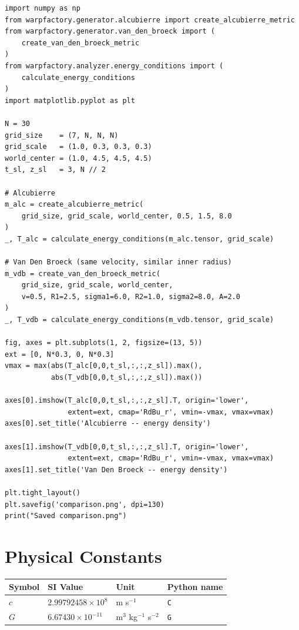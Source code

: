 \documentclass[11pt, a4paper, twoside]{report}
\begin{document}
\begin{lstlisting}[caption={Side-by-side energy comparison}]
import numpy as np
from warpfactory.generator.alcubierre import create_alcubierre_metric
from warpfactory.generator.van_den_broeck import (
    create_van_den_broeck_metric
)
from warpfactory.analyzer.energy_conditions import (
    calculate_energy_conditions
)
import matplotlib.pyplot as plt

N = 30
grid_size    = (7, N, N, N)
grid_scale   = (1.0, 0.3, 0.3, 0.3)
world_center = (1.0, 4.5, 4.5, 4.5)
t_sl, z_sl   = 3, N // 2

# Alcubierre
m_alc = create_alcubierre_metric(
    grid_size, grid_scale, world_center, 0.5, 1.5, 8.0
)
_, T_alc = calculate_energy_conditions(m_alc.tensor, grid_scale)

# Van Den Broeck (same velocity, similar inner radius)
m_vdb = create_van_den_broeck_metric(
    grid_size, grid_scale, world_center,
    v=0.5, R1=2.5, sigma1=6.0, R2=1.0, sigma2=8.0, A=2.0
)
_, T_vdb = calculate_energy_conditions(m_vdb.tensor, grid_scale)

fig, axes = plt.subplots(1, 2, figsize=(13, 5))
ext = [0, N*0.3, 0, N*0.3]
vmax = max(abs(T_alc[0,0,t_sl,:,:,z_sl]).max(),
           abs(T_vdb[0,0,t_sl,:,:,z_sl]).max())

axes[0].imshow(T_alc[0,0,t_sl,:,:,z_sl].T, origin='lower',
               extent=ext, cmap='RdBu_r', vmin=-vmax, vmax=vmax)
axes[0].set_title('Alcubierre -- energy density')

axes[1].imshow(T_vdb[0,0,t_sl,:,:,z_sl].T, origin='lower',
               extent=ext, cmap='RdBu_r', vmin=-vmax, vmax=vmax)
axes[1].set_title('Van Den Broeck -- energy density')

plt.tight_layout()
plt.savefig('comparison.png', dpi=130)
print("Saved comparison.png")
\end{lstlisting}

\appendix

\chapter{Physical Constants}
\label{app:constants}

\begin{center}
\begin{tabular}{llll}
  \toprule
  Symbol & SI Value & Unit & Python name \\
  \midrule
  $c$ & $2.99792458 \times 10^8$ & m s$^{-1}$ & \texttt{C} \\
  $G$ & $6.67430   \times 10^{-11}$ & m$^3$ kg$^{-1}$ s$^{-2}$ & \texttt{G} \\
  \bottomrule
\end{tabular}
\end{center}
\end{document}
